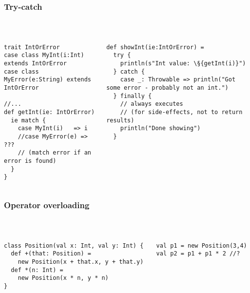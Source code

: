 \documentclass[aspectratio=169]{beamer}
\begin{document}
\begin{frame}[fragile]\frametitle{Try-catch}
~\\[-8mm]
\begin{columns}
\begin{column}{0.56\textwidth}
\begin{lstlisting}
trait IntOrError
case class MyInt(i:Int)      extends IntOrError
case class MyError(e:String) extends IntOrError

//...
def getInt(ie: IntOrError)
  ie match {
    case MyInt(i)   => i
    //case MyError(e) => ???
    // (match error if an error is found)
  }
}
\end{lstlisting}
\end{column}
\begin{column}{0.42\textwidth}
\begin{lstlisting}
def showInt(ie:IntOrError) = 
  try {
    println(s"Int value: \§{getInt(i)}")
  } catch { 
    case _: Throwable => println("Got some error - probably not an int.")
  } finally {
    // always executes
    // (for side-effects, not to return results)
    println("Done showing")
  }
\end{lstlisting}
\end{column}
\end{columns}
\end{frame}

\begin{frame}[fragile]\frametitle{Operator overloading}
~\\[-8mm]
\begin{columns}
\begin{column}{0.56\textwidth}
\begin{lstlisting}
class Position(val x: Int, val y: Int) {
  def +(that: Position) =
    new Position(x + that.x, y + that.y)
  def *(n: Int) =
    new Position(x * n, y * n)
}
\end{lstlisting}
\end{column}
\begin{column}{0.42\textwidth}
\begin{lstlisting}
val p1 = new Position(3,4)
val p2 = p1 + p1 * 2 //?
\end{lstlisting}
\end{column}
\end{columns}
\end{frame}
\end{document}
